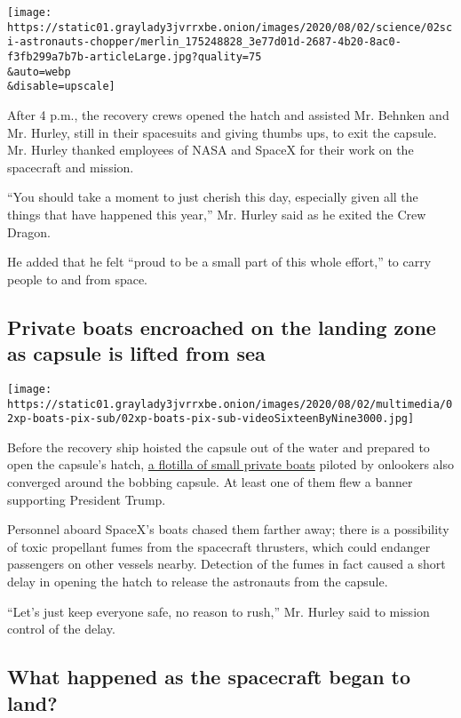 \texttt{[image: https://static01.graylady3jvrrxbe.onion/images/2020/08/02/science/02sci-astronauts-chopper/merlin\_175248828\_3e77d01d-2687-4b20-8ac0-f3fb299a7b7b-articleLarge.jpg?quality=75\\\&auto=webp\\\&disable=upscale]}

After 4 p.m., the recovery crews opened the hatch and assisted Mr.
Behnken and Mr. Hurley, still in their spacesuits and giving thumbs ups,
to exit the capsule. Mr. Hurley thanked employees of NASA and SpaceX for
their work on the spacecraft and mission.

``You should take a moment to just cherish this day, especially given
all the things that have happened this year,'' Mr. Hurley said as he
exited the Crew Dragon.

He added that he felt ``proud to be a small part of this whole effort,''
to carry people to and from space.

\hypertarget{private-boats-encroached-on-the-landing-zone-as-capsule-is-lifted-from-sea}{%
\subsection{Private boats encroached on the landing zone as capsule is
lifted from
sea}\label{private-boats-encroached-on-the-landing-zone-as-capsule-is-lifted-from-sea}}

\texttt{[image: https://static01.graylady3jvrrxbe.onion/images/2020/08/02/multimedia/02xp-boats-pix-sub/02xp-boats-pix-sub-videoSixteenByNine3000.jpg]}

Before the recovery ship hoisted the capsule out of the water and
prepared to open the capsule's hatch,
\href{https://www.nytimes3xbfgragh.onion/2020/08/02/us/flag-boat-SpaceX.html}{a
flotilla of small private boats} piloted by onlookers also converged
around the bobbing capsule. At least one of them flew a banner
supporting President Trump.

Personnel aboard SpaceX's boats chased them farther away; there is a
possibility of toxic propellant fumes from the spacecraft thrusters,
which could endanger passengers on other vessels nearby. Detection of
the fumes in fact caused a short delay in opening the hatch to release
the astronauts from the capsule.

``Let's just keep everyone safe, no reason to rush,'' Mr. Hurley said to
mission control of the delay.

\hypertarget{what-happened-as-the-spacecraft-began-to-land}{%
\subsection{What happened as the spacecraft began to
land?}\label{what-happened-as-the-spacecraft-began-to-land}}

